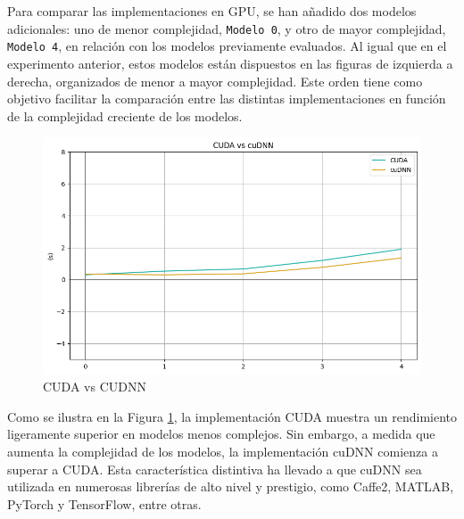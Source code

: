 Para comparar las implementaciones en GPU, se han añadido dos modelos adicionales: uno de menor complejidad, \texttt{Modelo 0}, y otro de mayor complejidad, \texttt{Modelo 4}, en relación con los modelos previamente evaluados. Al igual que en el experimento anterior, estos modelos están dispuestos en las figuras de izquierda a derecha, organizados de menor a mayor complejidad. Este orden tiene como objetivo facilitar la comparación entre las distintas implementaciones en función de la complejidad creciente de los modelos.

\begin{figure}[H]
	\centering
	\includegraphics[scale=0.52]{imagenes/cuda_cudnn_1.png}  
	\caption{CUDA vs CUDNN}
	\label{fig:cuda_cudnn_1}
\end{figure}

Como se ilustra en la Figura \ref{fig:cuda_cudnn_1}, la implementación CUDA muestra un rendimiento ligeramente superior en modelos menos complejos. Sin embargo, a medida que aumenta la complejidad de los modelos, la implementación cuDNN comienza a superar a CUDA. Esta característica distintiva ha llevado a que cuDNN sea utilizada en numerosas librerías de alto nivel y prestigio, como Caffe2, MATLAB, PyTorch y TensorFlow, entre otras. 

